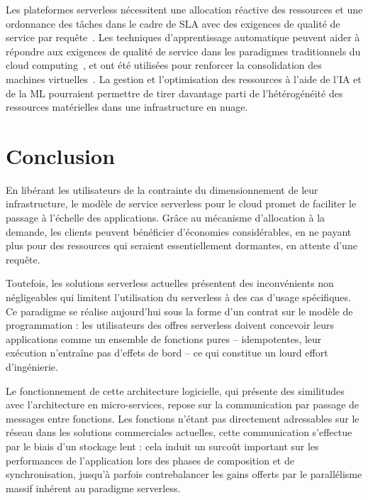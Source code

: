 Les plateformes serverless nécessitent une allocation réactive des ressources et une ordonnance des tâches dans le cadre de SLA avec des exigences de qualité de service par requête~\cite{gujaratiSwayamDistributedAutoscaling2017}. Les techniques d'apprentissage automatique peuvent aider à répondre aux exigences de qualité de service dans les paradigmes traditionnels du cloud computing~\cite{soniMachineLearningTechniques2022}, et ont été utilisées pour renforcer la consolidation des machines virtuelles~\cite{shawApplyingReinforcementLearning2022}. La gestion et l'optimisation des ressources à l'aide de l'IA et de la ML pourraient permettre de tirer davantage parti de l'hétérogénéité des ressources matérielles dans une infrastructure en nuage.

\section{Conclusion}

En libérant les utilisateurs de la contrainte du dimensionnement de leur infrastructure, le modèle de service serverless pour le cloud promet de faciliter le passage à l'échelle des applications. Grâce au mécanisme d'allocation à la demande, les clients peuvent bénéficier d'économies considérables, en ne payant plus pour des ressources qui seraient essentiellement dormantes, en attente d'une requête.

Toutefois, les solutions serverless actuelles présentent des inconvénients non négligeables qui limitent l'utilisation du serverless à des cas d'usage spécifiques. Ce paradigme se réalise aujourd'hui sous la forme d'un contrat sur le modèle de programmation : les utilisateurs des offres serverless doivent concevoir leurs applications comme un ensemble de fonctions pures -- idempotentes, leur exécution n'entraîne pas d'effets de bord -- ce qui constitue un lourd effort d'ingénierie.

Le fonctionnement de cette architecture logicielle, qui présente des similitudes avec l'architecture en micro-services, repose sur la communication par passage de messages entre fonctions. Les fonctions n'étant pas directement adressables sur le réseau dans les solutions commerciales actuelles, cette communication s'effectue par le biais d'un stockage lent : cela induit un surcoût important sur les performances de l'application lors des phases de composition et de synchronisation, jusqu'à parfois contrebalancer les gains offerts par le parallélisme massif inhérent au paradigme serverless.


